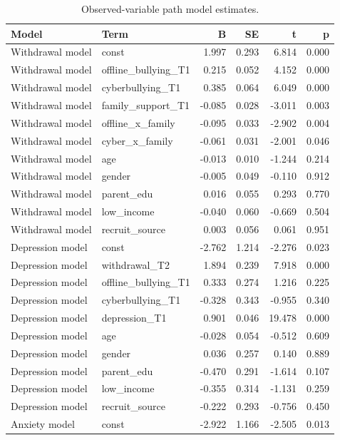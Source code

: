 \begin{table}
\caption{Observed-variable path model estimates.}
\label{tab:paths}
\begin{tabular}{llrrrr}
\toprule
Model & Term & B & SE & t & p \\
\midrule
Withdrawal model & const & 1.997 & 0.293 & 6.814 & 0.000 \\
Withdrawal model & offline_bullying_T1 & 0.215 & 0.052 & 4.152 & 0.000 \\
Withdrawal model & cyberbullying_T1 & 0.385 & 0.064 & 6.049 & 0.000 \\
Withdrawal model & family_support_T1 & -0.085 & 0.028 & -3.011 & 0.003 \\
Withdrawal model & offline_x_family & -0.095 & 0.033 & -2.902 & 0.004 \\
Withdrawal model & cyber_x_family & -0.061 & 0.031 & -2.001 & 0.046 \\
Withdrawal model & age & -0.013 & 0.010 & -1.244 & 0.214 \\
Withdrawal model & gender & -0.005 & 0.049 & -0.110 & 0.912 \\
Withdrawal model & parent_edu & 0.016 & 0.055 & 0.293 & 0.770 \\
Withdrawal model & low_income & -0.040 & 0.060 & -0.669 & 0.504 \\
Withdrawal model & recruit_source & 0.003 & 0.056 & 0.061 & 0.951 \\
Depression model & const & -2.762 & 1.214 & -2.276 & 0.023 \\
Depression model & withdrawal_T2 & 1.894 & 0.239 & 7.918 & 0.000 \\
Depression model & offline_bullying_T1 & 0.333 & 0.274 & 1.216 & 0.225 \\
Depression model & cyberbullying_T1 & -0.328 & 0.343 & -0.955 & 0.340 \\
Depression model & depression_T1 & 0.901 & 0.046 & 19.478 & 0.000 \\
Depression model & age & -0.028 & 0.054 & -0.512 & 0.609 \\
Depression model & gender & 0.036 & 0.257 & 0.140 & 0.889 \\
Depression model & parent_edu & -0.470 & 0.291 & -1.614 & 0.107 \\
Depression model & low_income & -0.355 & 0.314 & -1.131 & 0.259 \\
Depression model & recruit_source & -0.222 & 0.293 & -0.756 & 0.450 \\
Anxiety model & const & -2.922 & 1.166 & -2.505 & 0.013 \\

\end{tabular}
\end{table}
